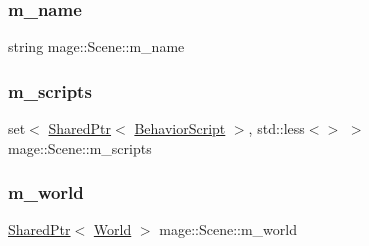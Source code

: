 \hypertarget{classmage_1_1_scene_a6cc8cb08b1853c4e3063b33a94e8fb47}{}\label{classmage_1_1_scene_a6cc8cb08b1853c4e3063b33a94e8fb47} 
\subsubsection{\texorpdfstring{m\+\_\+name}{m\_name}}
{\footnotesize\ttfamily string mage\+::\+Scene\+::m\+\_\+name\hspace{0.3cm}{\ttfamily [private]}}

\hypertarget{classmage_1_1_scene_a74ad0b8c6b085bd519de33da51ebb8dd}{}\label{classmage_1_1_scene_a74ad0b8c6b085bd519de33da51ebb8dd} 
\subsubsection{\texorpdfstring{m\+\_\+scripts}{m\_scripts}}
{\footnotesize\ttfamily set$<$ \hyperlink{namespacemage_a1e01ae66713838a7a67d30e44c67703e}{Shared\+Ptr}$<$ \hyperlink{classmage_1_1_behavior_script}{Behavior\+Script} $>$, std\+::less$<$$>$ $>$ mage\+::\+Scene\+::m\+\_\+scripts\hspace{0.3cm}{\ttfamily [private]}}

\hypertarget{classmage_1_1_scene_ab03b79c8ae30602fea1fabb84927a829}{}\label{classmage_1_1_scene_ab03b79c8ae30602fea1fabb84927a829} 
\subsubsection{\texorpdfstring{m\+\_\+world}{m\_world}}
{\footnotesize\ttfamily \hyperlink{namespacemage_a1e01ae66713838a7a67d30e44c67703e}{Shared\+Ptr}$<$ \hyperlink{classmage_1_1_world}{World} $>$ mage\+::\+Scene\+::m\+\_\+world\hspace{0.3cm}{\ttfamily [private]}}

